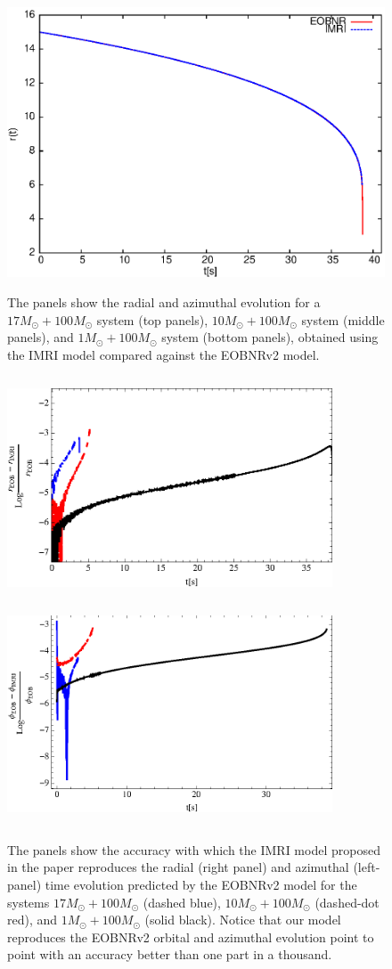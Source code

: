 \begin{figure}[ht]
{\includegraphics[height=0.38\textwidth,  clip]{figures/insimri/trim1100k}
}
\caption{The panels show the radial and azimuthal evolution for a \(17M_{\odot} + 100M_{\odot}\) system (top panels), \(10M_{\odot} + 100M_{\odot}\) system (middle panels), and \(1M_{\odot} + 100M_{\odot}\) system (bottom panels), obtained using the IMRI model compared against the EOBNRv2 model.}
\label{dv15100}
\end{figure}

\begin{figure}[ht]
\centerline{
\includegraphics[height=2.6in, width=3.8in,  clip]{figures/insimri/radacc}
\includegraphics[height=2.6in, width=3.8in,  clip]{figures/insimri/phaacc}
}
\caption{The panels show the accuracy with which the IMRI model proposed in the paper reproduces the radial (right panel) and azimuthal (left-panel) time evolution predicted by the EOBNRv2 model for the systems  \(17M_{\odot} + 100M_{\odot}\) (dashed blue), \(10M_{\odot} + 100M_{\odot}\) (dashed-dot red), and \(1M_{\odot} + 100M_{\odot}\) (solid black). Notice that our model reproduces the EOBNRv2 orbital and azimuthal evolution point to point with an accuracy better than  one part in a thousand. }
\label{randphiaccuracy}
\end{figure}



